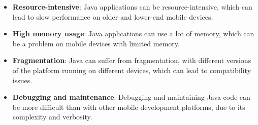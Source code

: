 \begin{itemize}
    \item \textbf{Resource-intensive}: Java applications can be resource-intensive, which can lead to slow performance on older and lower-end mobile devices.

    \item \textbf{High memory usage}: Java applications can use a lot of memory, which can be a problem on mobile devices with limited memory.

    \item \textbf{Fragmentation}: Java can suffer from fragmentation, with different versions of the platform running on different devices, which can lead to compatibility issues.

    \item \textbf{Debugging and maintenance}: Debugging and maintaining Java code can be more difficult than with other mobile development platforms, due to its complexity and verbosity.
\end{itemize}

